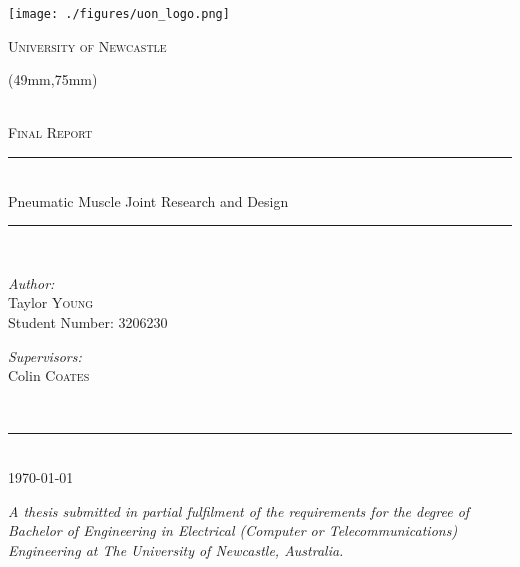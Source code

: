 \begin{titlepage}
    \begin{center}
        \begin{center}
            \texttt{[image: ./figures/uon\_logo.png]}
            
            \textsc{\LARGE University of Newcastle}\\[1cm]
        \end{center}
        
        \begin{textblock*}{133mm}(49mm,75mm)  %
            \begin{minipage}[t][65mm][t]{133mm}
                \centering
                ~\\[0.5cm]
                \textsc{\Large Final Report}\\[0.5cm]
            
                \hrule ~\\[0.5cm]
                { \Large Pneumatic Muscle Joint Research and Design\\[0.5cm] }
                \hrule ~\\[0.5cm]
            
                \noindent
                \begin{minipage}{0.4\textwidth}
                    \begin{flushleft} \large
                        \emph{Author:}\\
                        Taylor \textsc{Young}\\
                        Student Number: 3206230
                    \end{flushleft}
                \end{minipage}%
                \begin{minipage}{0.4\textwidth}
                    \begin{flushright} \large
                        \emph{Supervisors:} \\
                        Colin \textsc{Coates}\\
                    \end{flushright}
                \end{minipage}\\[0.5cm]
                \hrule ~\\[0.3cm]
                {\large \today}
            \end{minipage}
        \end{textblock*}
    \end{center}
    
    \vfill
    
    \emph{A thesis submitted in partial fulfilment of the requirements for the degree of Bachelor of Engineering in Electrical (Computer or Telecommunications) Engineering at The University of Newcastle, Australia.}
    
    \vfill
\end{titlepage}

